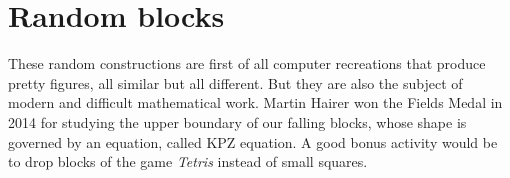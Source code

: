\documentclass[11pt,class=report,crop=false]{standalone}
\begin{document}
\section{Random blocks}

These random constructions are first of all computer recreations that produce pretty figures, all similar but all different. But they are also the subject of modern and difficult mathematical work. Martin Hairer won the Fields Medal in 2014 for studying the upper boundary of our falling blocks, whose shape is governed by an equation, called \og{}KPZ equation\fg{}.
A good bonus activity would be to drop blocks of the game \emph{Tetris} instead of small squares.
\end{document}
